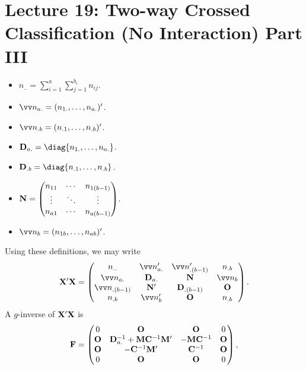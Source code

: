 \section{Lecture 19: Two-way Crossed Classification (No Interaction) Part III}
\begin{itemize}
    \item $ n_{..}=\sum_{i=1}^{a}\sum_{j=1}^{b_i} n_{ij} $.
    \item $ \Vector{n}_{a.}=(n_{1.},\ldots,n_{a.})' $.
    \item $ \Vector{n}_{.b}=(n_{.1},\ldots,n_{.b})' $.
    \item $ \Matrix{D}_{a.}=\diag{n_{1.},\ldots,n_{a.}} $.
    \item $ \Matrix{D}_{.b}=\diag{n_{.1},\ldots,n_{.b}} $.
    \item $ \mathbf{N}=\begin{pmatrix}
                  n_{11} & \cdots & n_{1(b-1)} \\
                  \vdots & \ddots & \vdots     \\
                  n_{a1} & \cdots & n_{a(b-1)}
              \end{pmatrix} $.
    \item $ \Vector{n}_{b}=(n_{1b},\ldots,n_{ab})' $.
\end{itemize}
Using these definitions, we may write
\[ \Matrix{X}'\Matrix{X}=\begin{pmatrix}
        n_{..}              & \Vector{n}_{a.}' & \Vector{n}_{.(b-1)}' & n_{.b}       \\
        \Vector{n}_{a.}     & \Matrix{D}_{a.}  & \Matrix{N}           & \Vector{n}_b \\
        \Vector{n}_{.(b-1)} & \Matrix{N}'      & \Matrix{D}_{.(b-1)}  & \Matrix{O}   \\
        n_{.b}              & \Vector{n}_{b}'  & \Matrix{O}           & n_{.b}
    \end{pmatrix}. \]
A $ g $-inverse of $ \mathbf{X}'\mathbf{X} $ is
\[ \mathbf{F}=\begin{pmatrix}
        0          & \mathbf{O}                                                & \mathbf{O}                 & 0          \\
        \mathbf{O} & \mathbf{D}_{a.}^{-1}+\mathbf{M}\mathbf{C}^{-1}\mathbf{M}' & -\mathbf{M}\mathbf{C}^{-1} & \mathbf{O} \\
        \mathbf{O} & -\mathbf{C}^{-1}\mathbf{M}'                               & \mathbf{C}^{-1}            & \mathbf{O} \\
        0          & \mathbf{O}                                                & \mathbf{O}                 & 0          \\
    \end{pmatrix}, \]
